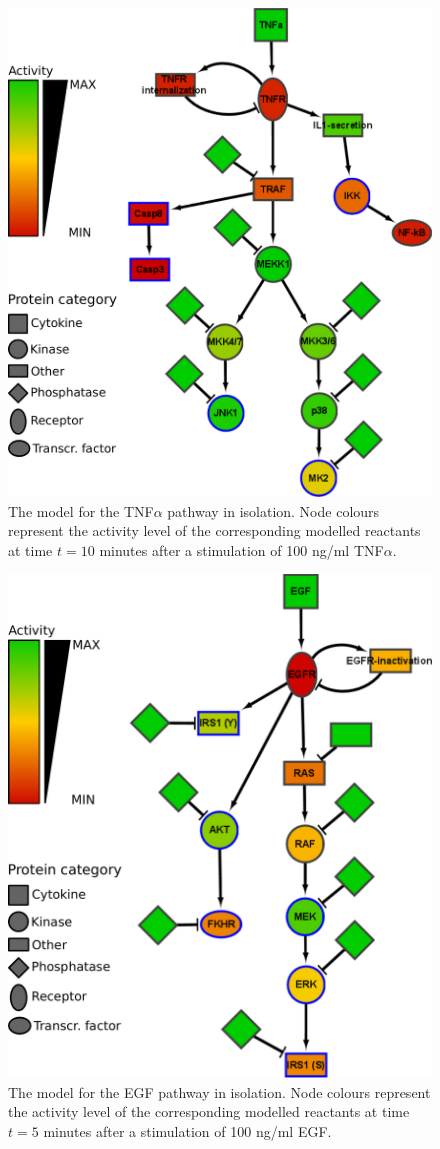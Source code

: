 \begin{figure}[htpb]
\begin{minipage}{\textwidth}
\centering
  \includegraphics[width=.7\textwidth]{images/large_network_tnfa2}
\caption{The model for the TNF$\alpha$ pathway in isolation. Node colours represent the activity level of the
corresponding modelled reactants at time $t = 10$ minutes after a stimulation of 100 ng/ml TNF$\alpha$.}\label{fig:large-model-tnf}
\end{minipage}
\end{figure}

\begin{figure}[!tpb]
\begin{minipage}{\textwidth}
\centering
  \includegraphics[width=.7\textwidth]{images/large_network_egf3}
\caption{The model for the EGF pathway in isolation. Node colours represent the
activity level of the corresponding modelled reactants at time $t = 5$ minutes after
a stimulation of 100 ng/ml EGF.}\label{fig:large-model-egf}
\end{minipage}
\end{figure}

